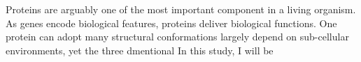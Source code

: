 Proteins are arguably one of the most important component in a living organism. As genes encode biological features, proteins deliver biological functions. One protein can adopt many structural conformations largely depend on sub-cellular environments, yet the three dmentional      In this study, I will be 
